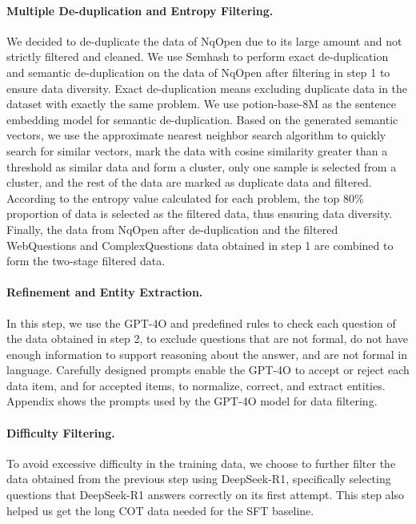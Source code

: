 \paragraph{Multiple De-duplication and Entropy Filtering.}
We decided to de-duplicate the data of NqOpen due to its large amount and not strictly filtered and cleaned. 
We use Semhash \citep{minishlab2025semhash} to perform exact de-duplication and semantic de-duplication on the data of NqOpen after filtering in step 1 to ensure data diversity. 
Exact de-duplication means excluding duplicate data in the dataset with exactly the same problem.
We use potion-base-8M \citep{minishlab2024model2vec} as the sentence embedding model for semantic de-duplication.
Based on the generated semantic vectors, we use the approximate nearest neighbor search algorithm to quickly search for similar vectors, mark the data with cosine similarity greater than a threshold as similar data and form a cluster, only one sample is selected from a cluster, and the rest of the data are marked as duplicate data and filtered. 
According to the entropy value calculated for each problem, the top 80\% proportion of data is selected as the filtered data, thus ensuring data diversity. 
Finally, the data from NqOpen after de-duplication and the filtered WebQuestions and ComplexQuestions data obtained in step 1 are combined to form the two-stage filtered data.

\paragraph{Refinement and Entity Extraction.}
In this step, we use the GPT-4O and predefined rules to check each question of the data obtained in step 2, to exclude questions that are not formal, do not have enough information to support reasoning about the answer, and are not formal in language. 
Carefully designed prompts enable the GPT-4O to accept or reject each data item, and for accepted items, to normalize, correct, and extract entities. 
Appendix shows the prompts used by the GPT-4O model for data filtering.

\paragraph{Difficulty Filtering.}
To avoid excessive difficulty in the training data, we choose to further filter the data obtained from the previous step using DeepSeek-R1, specifically selecting questions that DeepSeek-R1 answers correctly on its first attempt. 
This step also helped us get the long COT data needed for the SFT baseline.

